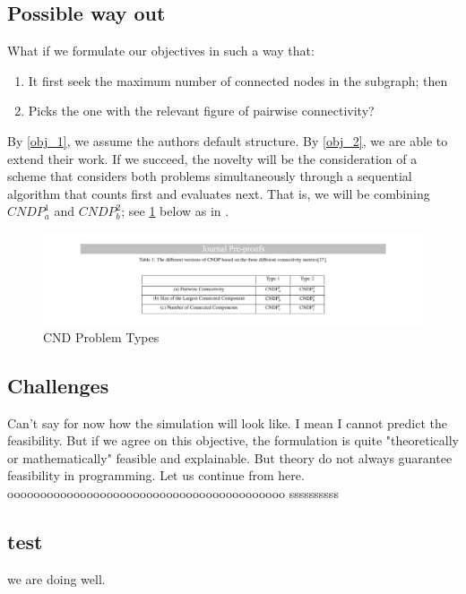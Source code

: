 \subsection{Possible way out}
What if we formulate our objectives in such a way that:
\begin{enumerate}
    \item It first seek the maximum number of connected nodes in the subgraph; then \label{obj_1}
    \item Picks the one with the relevant figure of pairwise connectivity? \label{obj_2}
\end{enumerate}
By \ref{obj_1}, we assume the authors default structure. By \ref{obj_2}, we are able to extend their work.
If we succeed, the novelty will be the consideration of a scheme that considers both problems simultaneously through a sequential algorithm that counts first and evaluates next. That is, we will be combining $CNDP_a^1$ and $CNDP_b^2$; see \ref{fig:cdnp} below as in \cite{rezaei2020eia}.
\begin{figure}[htb!]
    \centering \includegraphics[width=\textwidth]{graphics/cndp.png}
    \caption{CND Problem Types}
    \label{fig:cdnp}
\end{figure}

\subsection{Challenges}
Can't say for now how the simulation will look like. I mean I cannot predict the feasibility. But if we agree on this objective, the formulation is quite "theoretically or mathematically" feasible and explainable. But theory do not always guarantee feasibility in programming. Let us continue from here. oooooooooooooooooooooooooooooooooooooooooo ssssssssss

\subsection{test}
we are doing well.